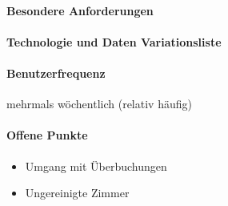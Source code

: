 \paragraph{Besondere Anforderungen}

\paragraph{Technologie und Daten Variationsliste}

\paragraph{Benutzerfrequenz}
mehrmals wöchentlich (relativ häufig)

\paragraph{Offene Punkte}
\begin{itemize}
	\item Umgang mit Überbuchungen
	\item Ungereinigte Zimmer
\end{itemize}

\newpage

